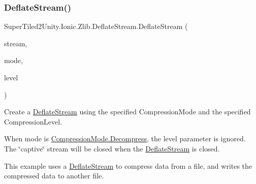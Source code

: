 \subsubsection{\texorpdfstring{Deflate\+Stream()}{DeflateStream()}\hspace{0.1cm}{\footnotesize\ttfamily [2/4]}}
{\footnotesize\ttfamily Super\+Tiled2\+Unity.\+Ionic.\+Zlib.\+Deflate\+Stream.\+Deflate\+Stream (\begin{DoxyParamCaption}\item[{System.\+I\+O.\+Stream}]{stream,  }\item[{\mbox{\hyperlink{namespace_super_tiled2_unity_1_1_ionic_1_1_zlib_ad5b7635d92497e1c905e5de82eb1c6b1}{Compression\+Mode}}}]{mode,  }\item[{\mbox{\hyperlink{namespace_super_tiled2_unity_1_1_ionic_1_1_zlib_a20f6771804996c363f454ad9765cd7db}{Compression\+Level}}}]{level }\end{DoxyParamCaption})}



Create a \mbox{\hyperlink{class_super_tiled2_unity_1_1_ionic_1_1_zlib_1_1_deflate_stream}{Deflate\+Stream}} using the specified Compression\+Mode and the specified Compression\+Level. 

When mode is {\ttfamily \mbox{\hyperlink{namespace_super_tiled2_unity_1_1_ionic_1_1_zlib_ad5b7635d92497e1c905e5de82eb1c6b1a6d2861192fdf4370bcf95c099be0f2f0}{Compression\+Mode.\+Decompress}}}, the level parameter is ignored. The \char`\"{}captive\char`\"{} stream will be closed when the \mbox{\hyperlink{class_super_tiled2_unity_1_1_ionic_1_1_zlib_1_1_deflate_stream}{Deflate\+Stream}} is closed. 

This example uses a \mbox{\hyperlink{class_super_tiled2_unity_1_1_ionic_1_1_zlib_1_1_deflate_stream}{Deflate\+Stream}} to compress data from a file, and writes the compressed data to another file.


